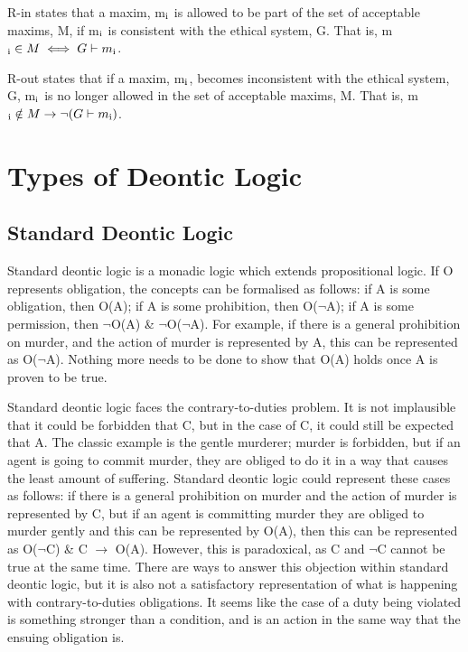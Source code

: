 \documentclass{l4proj}
\begin{document}
R-in states that a maxim, m\( \textsubscript{i} \) is allowed to be part of the set of acceptable maxims, M, if m\( \textsubscript{i} \) is consistent with the ethical system, G. That is, m\( \textsubscript{i}  \in M \iff G \vdash m \textsubscript{i} \). 

R-out states that if a maxim, m\( \textsubscript{i} \), becomes inconsistent with the ethical system, G, m\( \textsubscript{i} \) is no longer allowed in the set of acceptable maxims, M. That is, m\( \textsubscript{i}  \notin M \rightarrow \neg(G \vdash m \textsubscript{i}) \). 

\section{Types of Deontic Logic}

\subsection{Standard Deontic Logic}
Standard deontic logic is a monadic logic which extends propositional logic. If O represents obligation, the concepts can be formalised as follows: if A is some obligation, then O(A); if A is some prohibition, then O(\( \neg \)A); if A is some permission, then \( \neg \)O(A) \& \( \neg \)O(\( \neg \)A). For example, if there is a general prohibition on murder, and the action of murder is represented by A, this can be represented as O(\( \neg \)A). Nothing more needs to be done to show that O(A) holds once A is proven to be true. 

Standard deontic logic faces the contrary-to-duties problem. It is not implausible that it could be forbidden that C, but in the case of C, it could still be expected that A. The classic example is the gentle murderer; murder is forbidden, but if an agent is going to commit murder, they are obliged to do it in a way that causes the least amount of suffering. Standard deontic logic could represent these cases as follows: if there is a general prohibition on murder and the action of murder is represented by C, but if an agent is committing murder they are obliged to murder gently and this can be represented by O(A), then this can be represented as O(\( \neg \)C) \& C \( \to \) O(A). However, this is paradoxical, as C and \( \neg \)C cannot be true at the same time. There are ways to answer this objection within standard deontic logic, but it is also not a satisfactory representation of what is happening with contrary-to-duties obligations. It seems like the case of a duty being violated is something stronger than a condition, and is an action in the same way that the ensuing obligation is. 
\end{document}
